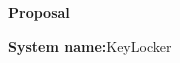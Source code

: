 \documentclass[11pt, letterpaper]{article}
\begin{document}
\centerline{\textbf{Proposal}}
\smallskip
\noindent\textbf{System name:}KeyLocker
\end{document}
